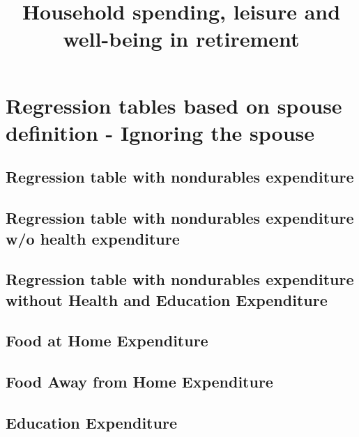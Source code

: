 \documentclass[a4paper,landscape]{article}
\begin{document}
	
	\title{Household spending, leisure and well-being in retirement}
	\date{}
	\maketitle
	
\section{Regression tables based on spouse definition - Ignoring the spouse}
\subsection{Regression table with nondurables expenditure}

\clearpage

\subsection{Regression table with nondurables expenditure w/o health expenditure} 

\clearpage

\subsection{Regression table with nondurables expenditure without Health and Education Expenditure}

\clearpage

\subsection{Food at Home Expenditure}

\clearpage

\subsection{Food Away from Home Expenditure}

\clearpage

\subsection{Education Expenditure}

\clearpage
\end{document}
